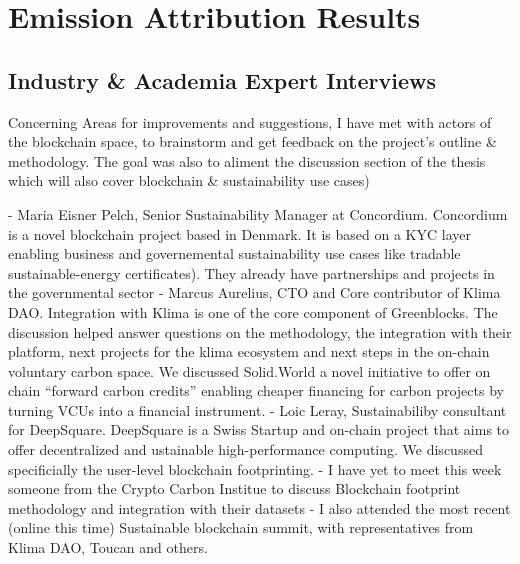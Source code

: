 \documentclass[11pt]{report}
\begin{document}

\section{Emission Attribution Results}





\subsection{Industry \& Academia Expert Interviews}

Concerning Areas for improvements and suggestions, I have met with actors of the blockchain space, to brainstorm and get feedback on the project's outline \& methodology. The goal was also to aliment the discussion section of the thesis which will also cover blockchain \& sustainability use cases)

- Maria Eisner Pelch, Senior Sustainability Manager at Concordium. Concordium is a novel blockchain project based in Denmark. It is based on a KYC layer enabling business and governemental sustainability use cases like tradable sustainable-energy certificates). They already have partnerships and projects in the governmental sector
- Marcus Aurelius, CTO and Core contributor of Klima DAO. Integration with Klima is one of the core component of Greenblocks. The discussion helped answer questions on the methodology, the integration with their platform, next projects for the klima ecosystem and next steps in the on-chain voluntary carbon space. We discussed Solid.World a novel initiative to offer on chain “forward carbon credits” enabling cheaper financing for carbon projects by turning VCUs into a financial instrument.
- Loic Leray, Sustainabiliby consultant for DeepSquare. DeepSquare is a Swiss Startup and on-chain project that aims to offer decentralized and ustainable high-performance computing. We discussed specificially the user-level blockchain footprinting.
- I have yet to meet this week someone from the Crypto Carbon Institue to discuss Blockchain footprint methodology and integration with their datasets
- I also attended the most recent (online this time) Sustainable blockchain summit, with representatives from Klima DAO, Toucan and others.
\end{document}

